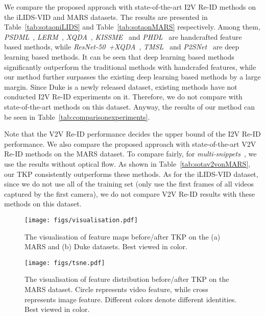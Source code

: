 \documentclass[10pt,twocolumn,letterpaper]{article}
\begin{document}
We compare the proposed approach with state-of-the-art I2V Re-ID methods on the iLIDS-VID and MARS datasets.
The results are presented in Table~\ref{tab:sotaoniLIDS} and Table~\ref{tab:sotaonMARS} respectively.
Among them, \textit{PSDML}~\cite{Zhu2013From}, \textit{LERM}~\cite{Huang2014Learning}, \textit{XQDA}~\cite{Liao2015Person}, \textit{KISSME}~\cite{K2012Large} and \textit{PHDL}~\cite{Zhu2017Learning} are handcrafted feature based methods, while \textit{ResNet-50}~\cite{He2016Deep}\textit{+XQDA}~\cite{Liao2015Person}, \textit{TMSL}~\cite{Zhang2017Image} and \textit{P2SNet}~\cite{Wang2017P2SNet} are deep learning based methods.
It can be seen that deep learning based methods significantly outperform the traditional methods with handcrafed features, while our method further surpasses the existing deep learning based methods by a large margin.
Since Duke is a newly released dataset, existing methods have not conducted I2V Re-ID experiments on it. 
Therefore, we do not compare with state-of-the-art methods on this dataset.
Anyway, the results of our method can be seen in Table~\ref{tab:comparisonexperiments}.

Note that the V2V Re-ID performance decides the upper bound of the I2V Re-ID performance.
We also compare the proposed approach with state-of-the-art V2V Re-ID methods on the MARS dataset.
To compare fairly, for \textit{multi-snippets}~\cite{Chen2018Video}, we use the results without optical flow.
As shown in Table~\ref{tab:sotav2vonMARS}, our TKP consistently outperforms these methods.
As for the iLIDS-VID dataset, since we do not use all of the training set (only use the first frames of all videos captured by the first camera), we do not compare V2V Re-ID results with these methods on this dataset.

\begin{figure}[t]
	\centering
	\texttt{[image: figs/visualisation.pdf]}\\
	\vspace{-10pt}
	\caption{The visualisation of feature maps before/after TKP on the (a) MARS and (b) Duke datasets. Best viewed in color.}
	\vspace{-15pt}
	\label{fig:fituremap}
\end{figure}

\begin{figure}[t]
	\centering
	\texttt{[image: figs/tsne.pdf]}
	\vspace{-10pt}
	\caption{The visualisation of feature distribution before/after TKP on the MARS dataset. 
		Circle represents video feature, while cross represents image feature.
		Different colors denote different identities.
		Best viewed in color.}
	\vspace{-15pt}
	\label{fig:featuredistribution}
\end{figure}
\end{document}
